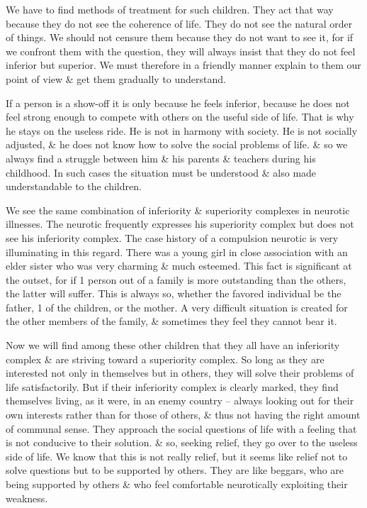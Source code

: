 \documentclass{article}
\numberwithin{equation}{section}
\begin{document}
We have to find methods of treatment for such children. They act that way because they do not see the coherence of life. They do not see the natural order of things. We should not censure them because they do not want to see it, for if we confront them with the question, they will always insist that they do not feel inferior but superior. We must therefore in a friendly manner explain to them our point of view \& get them gradually to understand.

If a person is a show-off it is only because he feels inferior, because he does not feel strong enough to compete with others on the useful side of life. That is why he stays on the useless ride. He is not in harmony with society. He is not socially adjusted, \& he does not know how to solve the social problems of life. \& so we always find a struggle between him \& his parents \& teachers during his childhood. In such cases the situation must be understood \& also made understandable to the children.

We see the same combination of inferiority \& superiority complexes in neurotic illnesses. The neurotic frequently expresses his superiority complex but does not see his inferiority complex. The case history of a compulsion neurotic is very illuminating in this regard. There was a young girl in close association with an elder sister who was very charming \& much esteemed. This fact is significant at the outset, for if 1 person out of a family is more outstanding than the others, the latter will suffer. This is always so, whether the favored individual be the father, 1 of the children, or the mother. A very difficult situation is created for the other members of the family, \& sometimes they feel they cannot bear it.

Now we will find among these other children that they all have an inferiority complex \& are striving toward a superiority complex. So long as they are interested not only in themselves but in others, they will solve their problems of life satisfactorily. But if their inferiority complex is clearly marked, they find themselves living, as it were, in an enemy country -- always looking out for their own interests rather than for those of others, \& thus not having the right amount of communal sense. They approach the social questions of life with a feeling that is not conducive to their solution. \& so, seeking relief, they go over to the useless side of life. We know that  this is not really relief, but it seems like relief not to solve questions but to be supported by others. They are like beggars, who are being supported by others \& who feel comfortable neurotically exploiting their weakness.
\end{document}
